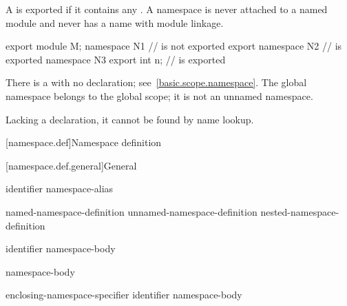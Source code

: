 \pnum
\begin{note}
A  is exported
if it contains any
.
A namespace is never attached to a named module
and never has a name with module linkage.
\end{note}
\begin{example}
\begin{codeblock}
export module M;
namespace N1 {}                 //  is not exported
export namespace N2 {}          //  is exported
namespace N3 { export int n; }  //  is exported
\end{codeblock}
\end{example}

\pnum
There is a  with no declaration;
see~\ref{basic.scope.namespace}.
The global namespace belongs to the global scope;
it is not an unnamed namespace.
\begin{note}
Lacking a declaration, it cannot be found by name lookup.
\end{note}

[namespace.def]{Namespace definition}%

[namespace.def.general]{General}%
%

\begin{bnf}
\br
        identifier\br
        namespace-alias
\end{bnf}

\begin{bnf}
\br
        named-namespace-definition\br
        unnamed-namespace-definition\br
        nested-namespace-definition
\end{bnf}

\begin{bnf}
\br
           identifier \terminal{\{} namespace-body \terminal{\}}
\end{bnf}

\begin{bnf}
\br
           \terminal{\{} namespace-body \terminal{\}}
\end{bnf}

\begin{bnf}
\br
         enclosing-namespace-specifier \terminal{::}  identifier \terminal{\{} namespace-body \terminal{\}}
\end{bnf}

